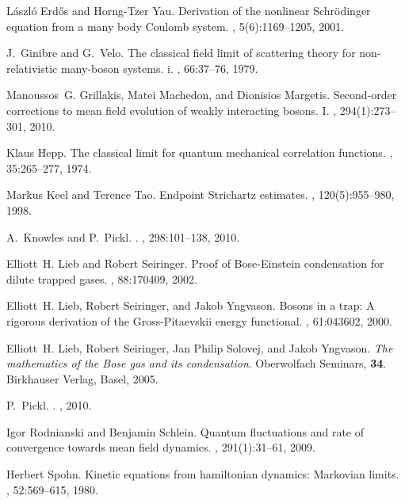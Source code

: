 \documentclass[11pt,a4paper]{article}
\begin{document}
\begin{thebibliography}{10}
L{\'a}szl{\'o} Erd{\H{o}}s and Horng-Tzer Yau.
\newblock Derivation of the nonlinear {S}chr\"odinger equation from a many body
  {C}oulomb system.
, 5(6):1169--1205, 2001.

J.~Ginibre and G.~Velo.
\newblock The classical field limit of scattering theory for non-relativistic
  many-boson systems. i.
, 66:37--76, 1979.

Manoussos~G. Grillakis, Matei Machedon, and Dionisios Margetis.
\newblock Second-order corrections to mean field evolution of weakly
  interacting bosons. {I}.
, 294(1):273--301, 2010.

Klaus Hepp.
\newblock The classical limit for quantum mechanical correlation functions.
, 35:265--277, 1974.

Markus Keel and Terence Tao.
\newblock Endpoint {S}trichartz estimates.
, 120(5):955--980, 1998.

A.~{Knowles} and P.~{Pickl}.
.
, 298:101--138, 2010.

Elliott~H. Lieb and Robert Seiringer.
\newblock Proof of {B}ose-{E}instein condensation for dilute trapped gases.
, 88:170409, 2002.

Elliott~H. Lieb, Robert Seiringer, and Jakob Yngvason.
\newblock Bosons in a trap: A rigorous derivation of the {G}ross-{P}itaevskii
  energy functional.
, 61:043602, 2000.

Elliott~H. Lieb, Robert Seiringer, Jan Philip Solovej, and Jakob Yngvason.
{\it The mathematics of the {B}ose gas and its condensation}. 
Oberwolfach Seminars, {\bf 34}. Birkhauser Verlag, Basel, 2005.

%
P.~{Pickl}.
.
, 2010.

Igor Rodnianski and Benjamin Schlein.
\newblock Quantum fluctuations and rate of convergence towards mean field
  dynamics.
, 291(1):31--61, 2009.

Herbert Spohn.
\newblock Kinetic equations from hamiltonian dynamics: Markovian limits.
, 52:569--615, 1980.

\end{thebibliography}
\end{document}
